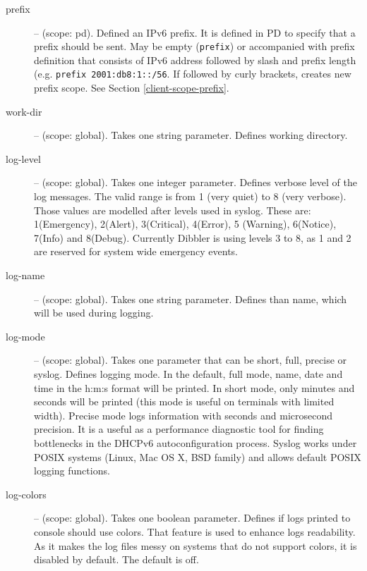 \begin{description}
\item[prefix] -- (scope: pd). Defined an IPv6 prefix. It is defined in
PD to specify that a prefix should be sent. May be empty
(\verb+prefix+) or accompanied with prefix definition that consists of
IPv6 address followed by slash and prefix length (e.g.
\verb+prefix 2001:db8:1::/56+. If followed by curly brackets, creates
new prefix scope. See Section \ref{client-scope-prefix}.

\item[work-dir] -- (scope: global). Takes one string
 parameter. Defines working directory.

\item[log-level] -- (scope: global). Takes one integer
parameter. Defines verbose level of the log messages. The valid range
is from 1 (very quiet) to 8 (very verbose). Those values are modelled
after levels used in syslog. These are: 1(Emergency), 2(Alert),
3(Critical), 4(Error), 5 (Warning), 6(Notice), 7(Info) and
8(Debug). Currently Dibbler is using levels 3 to 8, as 1 and 2 are
reserved for system wide emergency events.

\item[log-name] -- (scope: global). Takes one string
parameter. Defines than name, which will be used during logging.

\item[log-mode] -- (scope: global). Takes one parameter that can be
   short, full, precise or syslog. Defines logging mode. In the
   default, full mode, name, date and time in the h:m:s format will be
   printed. In short mode, only minutes and seconds will be printed
   (this mode is useful on terminals with limited width). Precise mode
   logs information with seconds and microsecond precision. It is a
   useful as a performance diagnostic tool for finding bottlenecks in
   the DHCPv6 autoconfiguration process. Syslog works under POSIX
   systems (Linux, Mac OS X, BSD family) and allows default POSIX
   logging functions.

\item[log-colors] -- (scope: global). Takes one boolean parameter.
  Defines if logs printed to console should use colors. That feature
  is used to enhance logs readability.  As it makes the log files
  messy on systems that do not support colors, it is disabled by
  default. The default is off.


\end{description}
